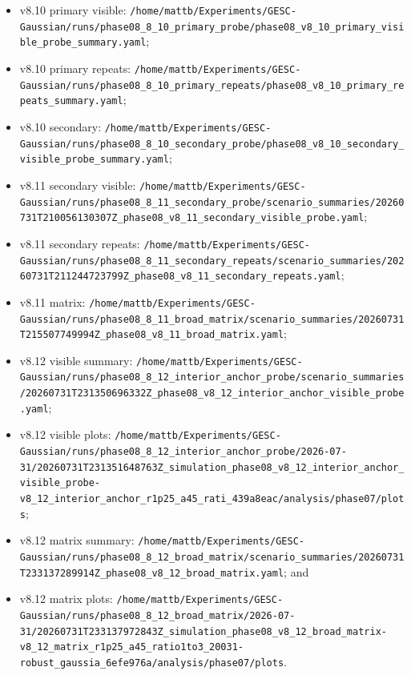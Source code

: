 \documentclass[
  10pt,
  letterpaper,
]{article}
\providecommand{\tightlist}{%
  \setlength{\itemsep}{0pt}\setlength{\parskip}{0pt}}
\begin{document}
\begin{itemize}
\tightlist
\item
  v8.10 primary visible:
  \nolinkurl{/home/mattb/Experiments/GESC-Gaussian/runs/phase08\_8\_10\_primary\_probe/phase08\_v8\_10\_primary\_visible\_probe\_summary.yaml};
\item
  v8.10 primary repeats:
  \nolinkurl{/home/mattb/Experiments/GESC-Gaussian/runs/phase08\_8\_10\_primary\_repeats/phase08\_v8\_10\_primary\_repeats\_summary.yaml};
\item
  v8.10 secondary:
  \nolinkurl{/home/mattb/Experiments/GESC-Gaussian/runs/phase08\_8\_10\_secondary\_probe/phase08\_v8\_10\_secondary\_visible\_probe\_summary.yaml};
\item
  v8.11 secondary visible:
  \nolinkurl{/home/mattb/Experiments/GESC-Gaussian/runs/phase08\_8\_11\_secondary\_probe/scenario\_summaries/20260731T210056130307Z\_phase08\_v8\_11\_secondary\_visible\_probe.yaml};
\item
  v8.11 secondary repeats:
  \nolinkurl{/home/mattb/Experiments/GESC-Gaussian/runs/phase08\_8\_11\_secondary\_repeats/scenario\_summaries/20260731T211244723799Z\_phase08\_v8\_11\_secondary\_repeats.yaml};
\item
  v8.11 matrix:
  \nolinkurl{/home/mattb/Experiments/GESC-Gaussian/runs/phase08\_8\_11\_broad\_matrix/scenario\_summaries/20260731T215507749994Z\_phase08\_v8\_11\_broad\_matrix.yaml};
\item
  v8.12 visible summary:
  \nolinkurl{/home/mattb/Experiments/GESC-Gaussian/runs/phase08\_8\_12\_interior\_anchor\_probe/scenario\_summaries/20260731T231350696332Z\_phase08\_v8\_12\_interior\_anchor\_visible\_probe.yaml};
\item
  v8.12 visible plots:
  \nolinkurl{/home/mattb/Experiments/GESC-Gaussian/runs/phase08\_8\_12\_interior\_anchor\_probe/2026-07-31/20260731T231351648763Z\_simulation\_phase08\_v8\_12\_interior\_anchor\_visible\_probe-v8\_12\_interior\_anchor\_r1p25\_a45\_rati\_439a8eac/analysis/phase07/plots};
\item
  v8.12 matrix summary:
  \nolinkurl{/home/mattb/Experiments/GESC-Gaussian/runs/phase08\_8\_12\_broad\_matrix/scenario\_summaries/20260731T233137289914Z\_phase08\_v8\_12\_broad\_matrix.yaml}; and
\item
  v8.12 matrix plots:
  \nolinkurl{/home/mattb/Experiments/GESC-Gaussian/runs/phase08\_8\_12\_broad\_matrix/2026-07-31/20260731T233137972843Z\_simulation\_phase08\_v8\_12\_broad\_matrix-v8\_12\_matrix\_r1p25\_a45\_ratio1to3\_20031-robust\_gaussia\_6efe976a/analysis/phase07/plots}.
\end{itemize}
\end{document}
